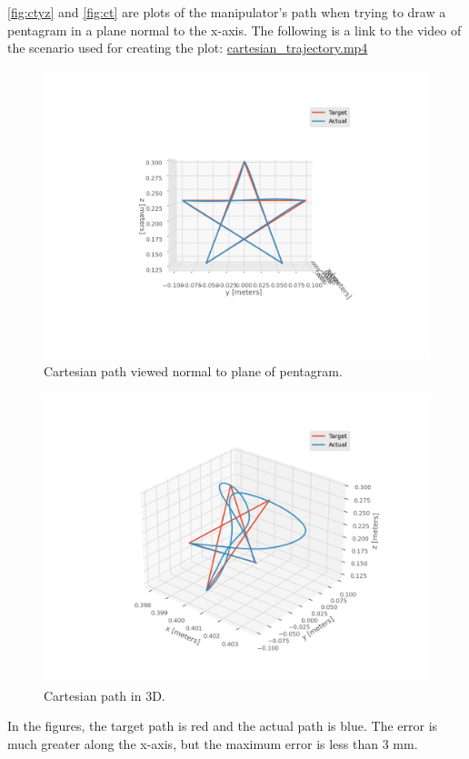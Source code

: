 \documentclass{article}
\begin{document}
\autoref{fig:ctyz} and \autoref{fig:ct} are plots of the manipulator's path when trying to draw a pentagram in a plane
normal to the x-axis.
The following is a link to the video of the scenario used for creating the plot:
\href{./cartesian\_trajectory.mp4}{cartesian\_trajectory.mp4}
\begin{figure}[h]
  \centering
  \includegraphics[width=0.6\linewidth]{cartesian_trajectory_yz}
  \caption{Cartesian path viewed normal to plane of pentagram.}
  \label{fig:ctyz}
\end{figure}
\begin{figure}[h]
  \centering
  \includegraphics[width=0.6\linewidth]{cartesian_trajectory}
  \caption{Cartesian path in 3D.}
  \label{fig:ct}
\end{figure}
In the figures, the target path is red and the actual path is blue.
The error is much greater along the x-axis, but the maximum error is less than 3 mm.
\end{document}
